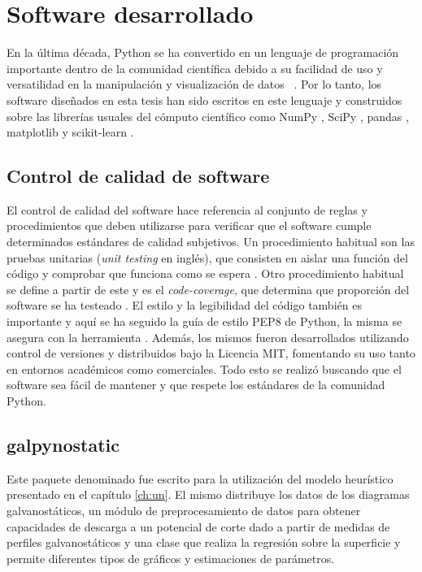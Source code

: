 \chapter{Software desarrollado}\label{a:software}

En la última década, Python se ha convertido en un lenguaje de programación 
importante dentro de la comunidad científica debido a su facilidad de uso y 
versatilidad en la manipulación y visualización de datos ~\cite{millman2011}. 
Por lo tanto, los software diseñados en esta tesis han sido escritos en este
lenguaje y construidos sobre las librerías usuales del cómputo científico como
NumPy \cite{numpy}, SciPy \cite{scipy}, pandas \cite{pandas}, 
matplotlib \cite{matplotlib} y scikit-learn \cite{sklearn1, sklearn2}. 


\section{Control de calidad de software}

El control de calidad del software hace referencia al conjunto de reglas y 
procedimientos que deben utilizarse para verificar que el software cumple 
determinados estándares de calidad subjetivos. Un procedimiento habitual son las 
pruebas unitarias (\textit{unit testing} en inglés), que consisten en aislar una 
función del código y comprobar que funciona como se espera \cite{jazayeri2007}. 
Otro procedimiento habitual se define a partir de este y es el 
\textit{code-coverage}, que determina que proporción del software se ha testeado
\cite{miller1963}. El estilo y la legibilidad del código también es importante
y aquí se ha seguido la guía de estilo PEP8 de Python, la misma se asegura con 
la herramienta . Además, los mismos fueron desarrollados utilizando control 
de versiones  y distribuidos bajo la Licencia MIT, fomentando su uso tanto en 
entornos académicos como comerciales. Todo esto se realizó buscando que el 
software sea fácil de mantener y que respete los estándares de la comunidad Python.


\section{galpynostatic}\label{software:galpynostatic}

Este paquete denominado  fue escrito para la utilización
del modelo heurístico presentado en el capítulo \ref{ch:un}. El mismo distribuye 
los datos de los diagramas galvanostáticos, un módulo de preprocesamiento de datos
para obtener capacidades de descarga a un potencial de corte dado a partir de 
medidas de perfiles galvanostáticos y una clase que realiza la regresión sobre la 
superficie y permite diferentes tipos de gráficos y estimaciones de parámetros.

